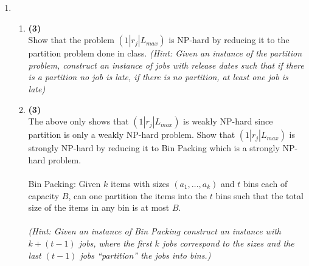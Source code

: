 \documentclass[10pt]{article}
\def\ni{\noindent}
\begin{document}
\begin{enumerate}
\item 
\begin{enumerate}
\item {\bf (3)} \\
Show that the problem $(1|r_j|L_{max})$ is NP-hard
by reducing it to the partition problem done in class. 
{\em (Hint: Given an instance of the partition problem, construct an instance of jobs with release dates such that if there is a partition no job is late, if there is no partition, at least one job is late)}
\item {\bf (3)} \\
The above only shows that $(1|r_j|L_{max})$ is weakly NP-hard since partition is only a weakly NP-hard problem. Show that $(1|r_j|L_{max})$ is strongly NP-hard by reducing it to {\sc Bin Packing} which is a strongly NP-hard problem. \\
\\
{\sc Bin Packing:} Given $k$ items with sizes $(a_1,\ldots, a_k)$ and $t$ bins each of capacity $B$, can one partition the items into the $t$ 
bins such that the total size of the items in any bin is at most $B$. \\
\\
\ni
{\em (Hint: Given an instance of {\sc Bin Packing} construct an instance with $k + (t-1)$ jobs, where the first $k$ jobs correspond to the sizes and the last $(t-1)$ jobs ``partition'' the jobs into bins.)}
\end{enumerate}



\end{enumerate}
\end{document}
